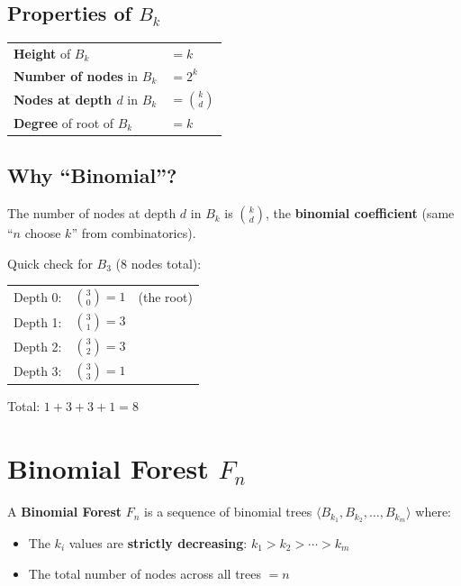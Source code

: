 \documentclass[11pt]{article}
\begin{document}
\subsection{Properties of $B_k$}

\begin{keybox}
\renewcommand{\arraystretch}{1.5}
\begin{tabular}{l l}
\textbf{\textcolor{violetT}{Height}} of $B_k$ & $= k$ \\
\textbf{\textcolor{violetT}{Number of nodes}} in $B_k$ & $= 2^k$ \\
\textbf{\textcolor{violetT}{Nodes at depth $d$}} in $B_k$ & $= \displaystyle\binom{k}{d}$ \\
\textbf{\textcolor{violetT}{Degree}} of root of $B_k$ & $= k$ \\
\end{tabular}
\end{keybox}

\subsection{Why ``Binomial''?}

\begin{examplebox}
The number of nodes at depth $d$ in $B_k$ is $\binom{k}{d}$, the \textbf{binomial coefficient} (same ``$n$ choose $k$'' from combinatorics).

Quick check for $B_3$ (8 nodes total):

\begin{center}
\renewcommand{\arraystretch}{1.3}
\begin{tabular}{l c l}
Depth 0: & $\binom{3}{0} = 1$ & (the root)\\
Depth 1: & $\binom{3}{1} = 3$ & \\
Depth 2: & $\binom{3}{2} = 3$ & \\
Depth 3: & $\binom{3}{3} = 1$ & \\
\end{tabular}
\end{center}
Total: $1 + 3 + 3 + 1 = 8$ \checkmark
\end{examplebox}

\section{Binomial Forest $F_n$}

\begin{defbox}
A \textbf{Binomial Forest} $F_n$ is a sequence of binomial trees $\langle B_{k_1}, B_{k_2}, \ldots, B_{k_m} \rangle$ where:
\begin{itemize}[leftmargin=1.4em,itemsep=1pt]
  \item The $k_i$ values are \textbf{strictly decreasing}: $k_1 > k_2 > \cdots > k_m$
  \item The total number of nodes across all trees $= n$
\end{itemize}
\end{defbox}
\end{document}
